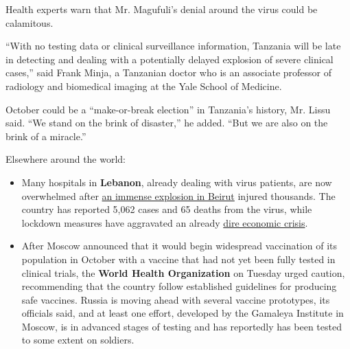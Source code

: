 Health experts warn that Mr. Magufuli's denial around the virus could be
calamitous.

``With no testing data or clinical surveillance information, Tanzania
will be late in detecting and dealing with a potentially delayed
explosion of severe clinical cases,'' said Frank Minja, a Tanzanian
doctor who is an associate professor of radiology and biomedical imaging
at the Yale School of Medicine.

October could be a ``make-or-break election'' in Tanzania's history, Mr.
Lissu said. ``We stand on the brink of disaster,'' he added. ``But we
are also on the brink of a miracle.''

Elsewhere around the world:

\begin{itemize}
\item
  Many hospitals in \textbf{Lebanon}, already dealing with virus
  patients, are now overwhelmed after
  \href{https://www.nytimes3xbfgragh.onion/2020/08/04/world/middleeast/beirut-explosion-blast.html}{an
  immense explosion in Beirut} injured thousands. The country has
  reported 5,062 cases and 65 deaths from the virus, while lockdown
  measures have aggravated an already
  \href{https://www.nytimes3xbfgragh.onion/2020/07/12/world/middleeast/beirut-lebanon-economic-crisis.html}{dire
  economic crisis}.
\item
  After Moscow announced that it would begin widespread vaccination of
  its population in October with a vaccine that had not yet been fully
  tested in clinical trials, the \textbf{World Health Organization} on
  Tuesday urged caution, recommending that the country follow
  established guidelines for producing safe vaccines. Russia is moving
  ahead with several vaccine prototypes, its officials said, and at
  least one effort, developed by the Gamaleya Institute in Moscow, is in
  advanced stages of testing and has reportedly has been tested to some
  extent on soldiers.
\end{itemize}

